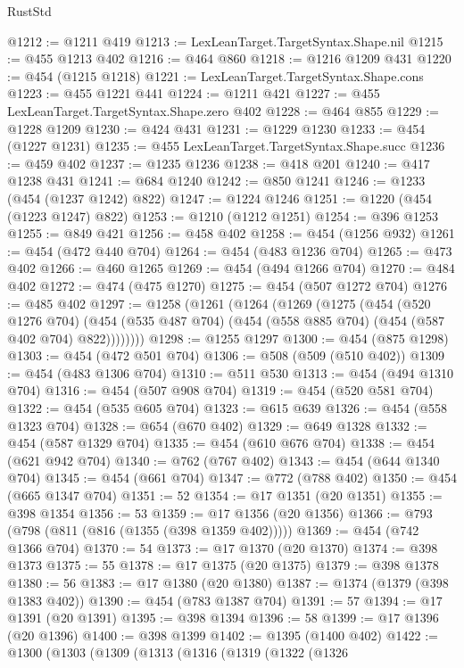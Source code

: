 \begin{lexlean}{RustStd}
\begin{coremodule}
{\begin{coremodule}
{{{{{{{{{{{{{{{{{{{{{{{{{{{{{{{{@1212 := @1211 @419
@1213 := LexLeanTarget.TargetSyntax.Shape.nil
@1215 := @455 @1213 @402
@1216 := @464 @860
@1218 := @1216 @1209 @431
@1220 := @454 (@1215 @1218)
@1221 := LexLeanTarget.TargetSyntax.Shape.cons
@1223 := @455 @1221 @441
@1224 := @1211 @421
@1227 := @455 LexLeanTarget.TargetSyntax.Shape.zero @402
@1228 := @464 @855
@1229 := @1228 @1209
@1230 := @424 @431
@1231 := @1229 @1230
@1233 := @454 (@1227 @1231)
@1235 := @455 LexLeanTarget.TargetSyntax.Shape.succ
@1236 := @459 @402
@1237 := @1235 @1236
@1238 := @418 @201
@1240 := @417 @1238 @431
@1241 := @684 @1240
@1242 := @850 @1241
@1246 := @1233 (@454 (@1237 @1242) @822)
@1247 := @1224 @1246
@1251 := @1220 (@454 (@1223 @1247) @822)
@1253 := @1210 (@1212 @1251)
@1254 := @396 @1253
@1255 := @849 @421
@1256 := @458 @402
@1258 := @454 (@1256 @932)
@1261 := @454 (@472 @440 @704)
@1264 := @454 (@483 @1236 @704)
@1265 := @473 @402
@1266 := @460 @1265
@1269 := @454 (@494 @1266 @704)
@1270 := @484 @402
@1272 := @474 (@475 @1270)
@1275 := @454 (@507 @1272 @704)
@1276 := @485 @402
@1297 := @1258
    (@1261
      (@1264
        (@1269
          (@1275
            (@454
              (@520 @1276 @704)
              (@454 (@535 @487 @704) (@454 (@558 @885 @704) (@454 (@587 @402 @704) @822))))))))
@1298 := @1255 @1297
@1300 := @454 (@875 @1298)
@1303 := @454 (@472 @501 @704)
@1306 := @508 (@509 (@510 @402))
@1309 := @454 (@483 @1306 @704)
@1310 := @511 @530
@1313 := @454 (@494 @1310 @704)
@1316 := @454 (@507 @908 @704)
@1319 := @454 (@520 @581 @704)
@1322 := @454 (@535 @605 @704)
@1323 := @615 @639
@1326 := @454 (@558 @1323 @704)
@1328 := @654 (@670 @402)
@1329 := @649 @1328
@1332 := @454 (@587 @1329 @704)
@1335 := @454 (@610 @676 @704)
@1338 := @454 (@621 @942 @704)
@1340 := @762 (@767 @402)
@1343 := @454 (@644 @1340 @704)
@1345 := @454 (@661 @704)
@1347 := @772 (@788 @402)
@1350 := @454 (@665 @1347 @704)
@1351 := 52
@1354 := @17 @1351 (@20 @1351)
@1355 := @398 @1354
@1356 := 53
@1359 := @17 @1356 (@20 @1356)
@1366 := @793 (@798 (@811 (@816 (@1355 (@398 @1359 @402)))))
@1369 := @454 (@742 @1366 @704)
@1370 := 54
@1373 := @17 @1370 (@20 @1370)
@1374 := @398 @1373
@1375 := 55
@1378 := @17 @1375 (@20 @1375)
@1379 := @398 @1378
@1380 := 56
@1383 := @17 @1380 (@20 @1380)
@1387 := @1374 (@1379 (@398 @1383 @402))
@1390 := @454 (@783 @1387 @704)
@1391 := 57
@1394 := @17 @1391 (@20 @1391)
@1395 := @398 @1394
@1396 := 58
@1399 := @17 @1396 (@20 @1396)
@1400 := @398 @1399
@1402 := @1395 (@1400 @402)
@1422 := @1300
    (@1303
      (@1309
        (@1313
          (@1316
            (@1319
              (@1322
                (@1326
}}}}}}}}}}}}}}}}}}}}}}}}}}}}}}}}
\end{coremodule}}
\end{coremodule}
\end{lexlean}
